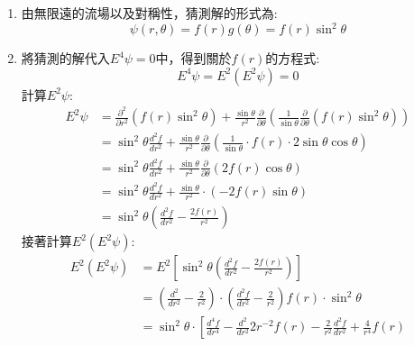 \documentclass[../main.tex]{subfiles}
\begin{document}
\begin{itemize}
\begin{enumerate}
\begin{align}
      \Rightarrow\quad \frac{\partial \psi}{\partial \theta} &= U r^2 \sin\theta \cos\theta \nonumber\\
      \Rightarrow\quad \psi &= U r^2 \int \sin\theta \cos\theta d\theta \nonumber\\
      &= U r^2 \cdot \frac{\sin^2\theta}{2} + C(r)
    \end{align}
    同理可驗證第四個邊界條件
    \item 由無限遠的流場以及對稱性，猜測解的形式為:
    \begin{equation}
      \boxed{\psi(r,\theta) = f(r)g(\theta) = f(r)\sin^2\theta}
    \end{equation}
    \item 將猜測的解代入$E^4 \psi = 0$中，得到關於$f(r)$的方程式:
    \begin{equation}
      E^4\psi = E^2(E^2 \psi) = 0
    \end{equation}
    計算$E^2 \psi$:
    \begin{align}
      E^2 \psi &= \frac{\partial^2}{\partial r^2}(f(r)\sin^2\theta) + \frac{\sin\theta}{r^2}\frac{\partial}{\partial \theta}\left(
        \frac{1}{\sin\theta}\frac{\partial}{\partial \theta}(f(r)\sin^2\theta)
      \right) \nonumber\\
      &= \sin^2\theta \frac{d^2 f}{d r^2} + \frac{\sin\theta}{r^2}\frac{\partial}{\partial \theta}\left(
        \frac{1}{\sin\theta} \cdot f(r) \cdot 2\sin\theta \cos\theta
      \right) \nonumber\\
      &= \sin^2\theta \frac{d^2 f}{d r^2} + \frac{\sin\theta}{r^2}\frac{\partial}{\partial \theta}\left(
        2f(r) \cos\theta
      \right) \nonumber\\
      &= \sin^2\theta \frac{d^2 f}{d r^2} + \frac{\sin\theta}{r^2} \cdot (-2f(r) \sin\theta) \nonumber\\
      &= \sin^2\theta \left(
        \frac{d^2 f}{d r^2} - \frac{2f(r)}{r^2}
      \right)
    \end{align}
    接著計算$E^2(E^2 \psi)$:
    \begin{align}
      E^2(E^2 \psi) &= E^2\left[
        \sin^2\theta \left(
          \frac{d^2 f}{d r^2} - \frac{2f(r)}{r^2}
        \right)
      \right] \nonumber\\
      &= \left(
        \frac{d^2}{d r^2} - \frac{2}{r^2}
      \right)\cdot\left(
        \frac{d^2 f}{d r^2} - \frac{2}{r^2}
      \right)f(r) \cdot \sin^2\theta \nonumber\\
      &= \sin^2\theta \cdot \left[
        \frac{d^4 f}{d r^4} - \frac{d^2}{dr^2}{2r^{-2}f(r)} - \frac{2}{r^2}\frac{d^2 f}{d r^2} + \frac{4}{r^4}f(r)

\end{align}
\end{enumerate}
\end{itemize}
\end{document}
